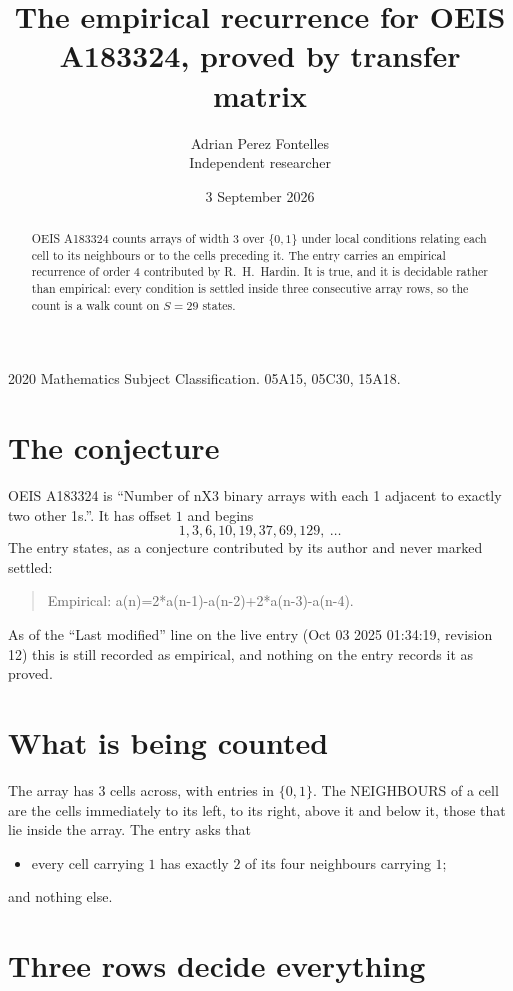 \documentclass[11pt,a4paper]{article}
\title{The empirical recurrence for OEIS A183324, proved by transfer matrix}
\author{Adrian Perez Fontelles\\ \small Independent researcher}
\date{3 September 2026}
\theoremstyle{plain}
\theoremstyle{definition}
\begin{document}
\maketitle

\begin{abstract}
OEIS A183324 counts arrays of width $3$ over $\{0,1\}$ under local conditions relating each cell
to its neighbours or to the cells preceding it. The entry carries an empirical recurrence of
order $4$ contributed by R.~H.~Hardin. It is true, and it is decidable rather than
empirical: every condition is settled inside three consecutive array rows, so the count is a
walk count on $S=29$ states.
\end{abstract}

\noindent\small 2020 Mathematics Subject Classification. 05A15, 05C30, 15A18.\normalsize

\section{The conjecture}

OEIS A183324 is ``Number of nX3 binary arrays with each 1 adjacent to exactly two other 1s.''. It has offset $1$ and begins
\[
1, 3, 6, 10, 19, 37, 69, 129,\ \dots
\]
The entry states, as a conjecture contributed by its author and never marked settled:
\begin{quote}
Empirical: a(n)=2*a(n-1)-a(n-2)+2*a(n-3)-a(n-4).
\end{quote}
As of the ``Last modified'' line on the live entry (Oct 03 2025 01:34:19, revision 12) this is still
recorded as empirical, and nothing on the entry records it as proved.

\section{What is being counted}

The array has $3$ cells across, with entries in $\{0,1\}$. The NEIGHBOURS of a cell are the
cells immediately to its left, to its right, above it and below it, those that lie inside the
array. The entry asks that
\begin{itemize}
\item every cell carrying $1$ has exactly $2$ of its four neighbours carrying $1$;
\end{itemize}
and nothing else.

\section{Three rows decide everything}
\end{document}
